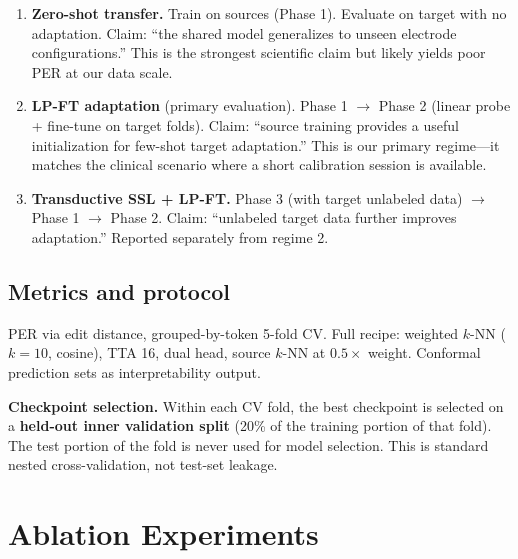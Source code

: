 \documentclass[11pt,letterpaper]{article}
\begin{document}
\begin{enumerate}[leftmargin=2em]
\item \textbf{Zero-shot transfer.} Train on sources (Phase 1). Evaluate on target with no adaptation. Claim: ``the shared model generalizes to unseen electrode configurations.'' This is the strongest scientific claim but likely yields poor PER at our data scale.

\item \textbf{LP-FT adaptation} (primary evaluation). Phase 1 $\to$ Phase 2 (linear probe + fine-tune on target folds). Claim: ``source training provides a useful initialization for few-shot target adaptation.'' This is our primary regime---it matches the clinical scenario where a short calibration session is available.

\item \textbf{Transductive SSL + LP-FT.} Phase 3 (with target unlabeled data) $\to$ Phase 1 $\to$ Phase 2. Claim: ``unlabeled target data further improves adaptation.'' Reported separately from regime 2.
\end{enumerate}

\subsection{Metrics and protocol}

PER via edit distance, grouped-by-token 5-fold CV. Full recipe: weighted $k$-NN ($k{=}10$, cosine), TTA 16, dual head, source $k$-NN at $0.5\times$ weight. Conformal prediction sets as interpretability output.

\textbf{Checkpoint selection.} Within each CV fold, the best checkpoint is selected on a \textbf{held-out inner validation split} (20\% of the training portion of that fold). The test portion of the fold is never used for model selection. This is standard nested cross-validation, not test-set leakage.


\section{Ablation Experiments}
\end{document}
